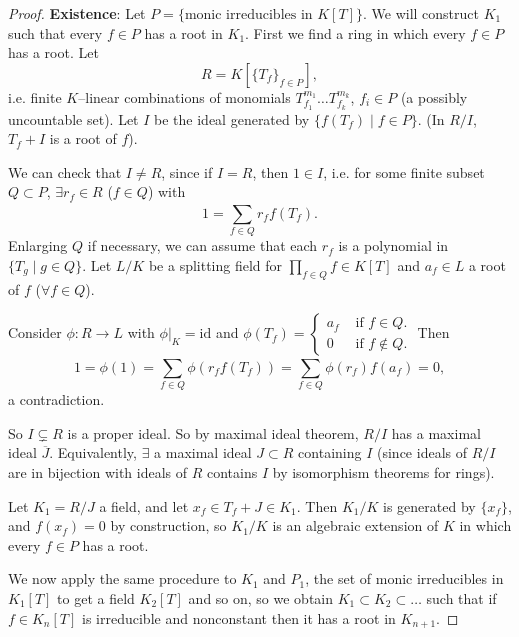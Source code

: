 \documentclass{article}
\theoremstyle{definition}
\begin{document}
\begin{proof}
    \textbf{Existence}: Let $P = \{\text{monic irreducibles in }K[T]\}$. We will construct $K_1$ such that every $f \in P$ has a root in $K_1$. First we find a ring in which every $f \in P$ has a root. Let \[
    R = K[\{T_f\}_{f \in P}],
    \]
    i.e. finite $K$--linear combinations of monomials $T_{f_1}^{m_1}\ldots T_{f_k}^{m_k}$, $f_i \in P$ (a possibly uncountable set). Let $I$ be the ideal generated by $\{f(T_f) \mid f \in P\}$. (In $R/I$, $T_f+I$ is a root of $f$). 
    \vspace{1mm}
    
    We can check that $I \neq R$, since if $I = R$, then $1 \in I$, i.e. for some finite subset $Q \subset P$, $\exists r_f \in R$ ($f \in Q$) with $$1=\sum_{f \in Q}^{} r_f f(T_f).$$ Enlarging $Q$ if necessary, we can assume that each $r_f$ is a polynomial in $\{T_g \mid g \in Q\}$. Let $L/K$ be a splitting field for $\prod_{f \in Q}^{} f \in K[T]$ and $a_f \in L$ a root of $f$ ($\forall f \in Q$).

    Consider $\phi : R \to L$ with $\phi|_K = \text{id}$ and $\phi(T_f) = \begin{cases}
        a_f &\text{ if }f \in Q.\\
        0 &\text{ if }f \not\in Q.
    \end{cases}$ 
    Then \[
        1 = \phi(1) = \sum_{f \in Q}^{} \phi(r_f f(T_f)) = \sum_{f \in Q}^{} \phi(r_f) f(a_f) = 0,
    \]
    a contradiction.
    \vspace{1mm}
    
    So $I \subsetneq R$ is a proper ideal. So by maximal ideal theorem, $R/I$ has a maximal ideal $\overline{J}$. Equivalently, $\exists$ a maximal ideal $J \subset R$ containing $I$ (since ideals of $R/I$ are in bijection with ideals of $R$ contains $I$ by isomorphism theorems for rings).
    \vspace{1mm}
    
    Let $K_1 = R/J$ a field, and let $x_f \in T_f + J \in K_1$. Then $K_1/K$ is generated by $\{x_f\}$, and $f(x_f)=0$ by construction, so $K_1/K$ is an algebraic extension of $K$ in which every $f \in P$ has a root.
    \vspace{1mm}
    
    We now apply the same procedure to $K_1$ and $P_1$, the set of monic irreducibles in $K_1[T]$ to get a field $K_2[T]$ and so on, so we obtain $K_1 \subset K_2 \subset \ldots$ such that if $f \in K_n[T]$ is irreducible and nonconstant then it has a root in $K_{n+1}$. 
    \vspace{1mm}
    

\end{proof}
\end{document}

